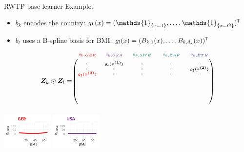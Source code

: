 \documentclass[t,10pt]{beamer}
\begin{document}
\begin{frame}{RWTP base learner}
  Example:
  \begin{itemize}
    \item $b_k$ encodes the country: $g_k(x) = (\mathds{1}_{\{x = 1\}}, \dots, \mathds{1}_{\{x = G\}})^\tran$
    \item $b_l$ uses a B-spline basis for BMI: $g_l(x) = (B_{k,1}(x), \dots, B_{k,d_k}(x))^{\mkern-1.5mu\mathsf{T}}$
  \end{itemize}
  $$
    \design_k \odot \design_l = \tiny\begin{blockarray}{ccccc}
      \color[HTML]{EE0000}g_{k,GER} & \color[HTML]{631879}g_{k,USA} & \color[HTML]{008B45}g_{k,SWE} & \color[HTML]{008280}g_{k,ZAF} & \color[HTML]{3B4992}g_{k,ETH}\\
    \begin{block}{(ccccc)}
      \phantom{x}\\
      \color{lightgray}0 & \color{black}\bm{g_l(x^{(1)})} & \color{lightgray}0 & \color{lightgray}0 & \color{lightgray}0 \\
      \color{lightgray}0 & \color{lightgray}0 & \color{lightgray}0 & \color{lightgray}0 & \color{black}\bm{g_l(x^{(2)})} \\
      \color[HTML]{EE0000}\bm{g_l(x^{(3)})} & \color{lightgray}0 & \color{lightgray}0 & \color{lightgray}0 & \color{lightgray}0 \\
      \color{white}\vdots & \color{white}\vdots & \color{white}\vdots & \color{white}\vdots & \color{white}\vdots \\
      \color{white}0 & \color{white}0 & \color{white}\bm{g_l(x^{(73)})} & \color{white}0 & \color{white}0 \\
      \color{white}0 & \color{white}0 & \color{white}0 & \color{white}\bm{g_l(x^{(74)})} & \color{white}0 \\
      \color{white}0 & \color{white}0 & \color{white}\bm{g_l(x^{(75)})} & \color{white}0 & \color{white}0 \\
      \phantom{x}\\
    \end{block}
  \end{blockarray}
  $$
  \normalsize
  \includegraphics[width=0.19\textwidth]{figures/bs-tensor/fig-tensor-GER.png}
  {\includegraphics[width=0.19\textwidth]{figures/bs-tensor/fig-tensor-USA.png}}

\end{frame}
\end{document}

